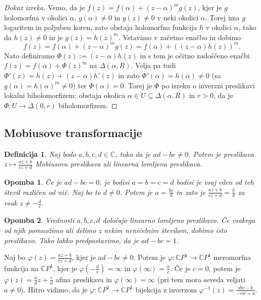 \documentclass[10pt, a4paper]{article}
\newtheorem{defi}{Definicija}[section]
\newenvironment{noticeB}{%
  \tcolorbox[%
  notitle,
  empty,
  enhanced,  %
  breakable,
  coltext=black,
  colback=white, 
  fontupper=\rmfamily,
  parbox=false,
  noparskip,
  sharp corners,
  boxrule=-1pt,  %
  frame hidden,
  left=7pt,  %
  right=7pt,
  top=5pt,
  bottom=5pt,
  before skip=2.5ex plus 2pt,
  after skip=2.5ex plus 2pt,
  borderline west = {1.5pt}{-0.1pt}{blue!30!black}, %
  overlay unbroken and last={%
    \draw[color=black, line width=1.25pt]
    ($(frame.south west)+(1.pt, -0.1pt)$) -- ++(2em, 0);
  }
  ]}
{\endtcolorbox}
\newenvironment{definicija}{\begin{defi}\begin{noticeB}}{%
    \end{noticeB}\end{defi}}
\newtheorem*{opomba}{Opomba}
\newenvironment{noticeC}{%
  \tcolorbox[%
  notitle,
  empty,
  enhanced,  %
  breakable,
  coltext=black, 
  fontupper=\rmfamily,
  parbox=false,
  noparskip,
  sharp corners,
  boxrule=-1pt,  %
  frame hidden,
  left=7pt,  %
  right=7pt,
  top=5pt,
  bottom=5pt,
  before skip=2.5ex plus 2pt,
  after skip=2.5ex plus 2pt,
  overlay unbroken and last={%
  },
  ]}
{\endtcolorbox}
\newenvironment{dokaz}%
  {\begin{noticeC}\begin{proof}}%
  {\end{proof}\end{noticeC}}
\newcommand{\C}{\mathbb {C}}
\begin{document}
\begin{dokaz}[Dokaz izreka]
  Vemo, da je $f(z) = f(\alpha) + (z - \alpha)^m g(z)$,
  kjer je $g$ holomorfna v okolici $\alpha$, $g(\alpha) \neq 0$ in $g(z) \neq 0$ 
  v neki okolici $\alpha$. Torej ima $g$ logaritem in poljuben koren, zato obstaja holomorfna funkcija $h$
  v okolici $\alpha$, tako da $h(z) \neq 0$ in je $g(z) = h(z)^m$.
  Vstavimo v začetno enačbo in dobimo $$f(z) = f(\alpha) + (z - \alpha)^m g(z) = f(\alpha) + ((z - \alpha) h(z))^m.$$
  Nato definiramo $\Phi(z) := (z - \alpha) h(z)$ in s tem je očitno zadoščeno enačbi $f(z) = f(\alpha)+ \Phi(z)^m$
  na $\Delta(\alpha, R)$. Velja pa tudi $\Phi'(z) = h(z) + (z - \alpha) h'(z)$ in zato $\Phi'(\alpha) = h(\alpha) \neq 0$
  (sa $g(\alpha) = h(\alpha)^m \neq 0$) ter $\Phi(\alpha) = 0.$
  Torej je $\Phi$ po izreku o inverzni preslikavi lokalni biholomorfizem: obstaja okolica $\alpha \in U \subseteq \Delta (\alpha, R)$
  in $r > 0$, da je $\Phi: U \to \Delta(0, r)$ biholomorfizem.
\end{dokaz}

\subsection{Mobiusove transformacije}

\begin{definicija}
  Naj bodo $a, b, c, d \in \C$, tako da je $ad - bc \neq 0$.
  Potem je preslikava $z \mapsto \frac{az + b}{cz + d}$ Mobiusova preslikava 
  ali linearna lomljena preslikava.
\end{definicija}

\begin{opomba}
  Če je $ad - bc = 0$, je bodisi $a = b = c = d$ bodisi je vsaj eden od teh števil različen od nič.
  Naj bo to $d \neq 0$. Potem je $a = \frac{bc}{d}$ in zato je $\frac{az + b}{cz + d} = \frac{b}{d}$
  za vsak $z \neq -\frac{d}{c}$.
\end{opomba}

\begin{opomba}
  Vrednosti $a, b, c, d$ določajo linearno lomljeno preslikavo.
  Če vsakega od njih pomnožimo ali delimo z nekim neničelnim številom, dobimo isto preslikavo.
  Tako lahko predpostavimo, da je $ad - bc = 1$.
\end{opomba}

Naj bo $\varphi(z) = \frac{az + b}{cz + d}$, kjer je $ad - bc \neq 0$.
Potem je $\varphi: \C P^1 \to \C P^1$ meromorfna funkcija na $\C P^1$, kjer je $\varphi\left(-\frac{d}{c}\right) = \infty$
in $\varphi(\infty) = \frac{a}{c}$. Če je $c = 0$, potem je $\varphi(z) = \frac{a}{d}z + \frac{c}{d}$ afina preslikava
in $\varphi(\infty) = \infty$ (pri tem mora seveda veljati $a \neq 0$).
Hitro vidimo, da je $\varphi: \C P^1 \to \C P^1$ bijekcija z inverzom $\varphi^{-1} (z) = \frac{dw - b}{-cw + a}$.
\end{document}
